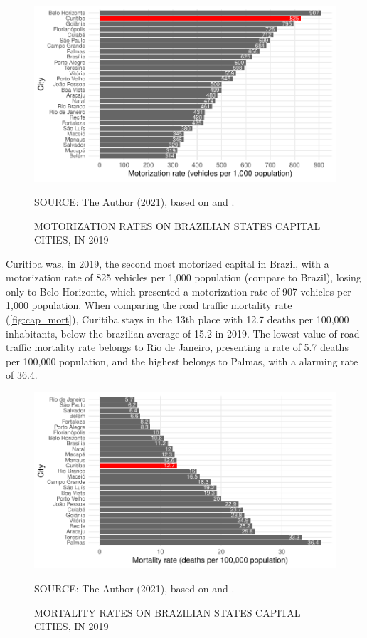 \begin{figure}[!htbp]
    \centering\footnotesize
    \captionsetup{font=footnotesize}
    \caption{MOTORIZATION RATES ON BRAZILIAN STATES CAPITAL CITIES, IN 2019}
    \includegraphics{fig/cap_motor.pdf}
    \label{fig:cap_motor}
    \par SOURCE: The Author (2021), based on \textcite{MinistryofHealth2021} and \textcite{DENATRAN2020}.
\end{figure}   

Curitiba was, in 2019, the second most motorized capital in Brazil, with a motorization rate of 825 vehicles per 1,000 population (compare to Brazil), losing only to Belo Horizonte, which presented a motorization rate of 907 vehicles per 1,000 population. When comparing the road traffic mortality rate (\autoref{fig:cap_mort}), Curitiba stays in the 13th place with 12.7 deaths per 100,000 inhabitants, below the brazilian average of 15.2 in 2019. The lowest value of road traffic mortality rate belongs to Rio de Janeiro, presenting a rate of 5.7 deaths per 100,000 population, and the highest belongs to Palmas, with a alarming rate of 36.4. 

\begin{figure}[!htbp]
    \centering\footnotesize
    \captionsetup{font=footnotesize}
    \caption{MORTALITY RATES ON BRAZILIAN STATES CAPITAL CITIES, IN 2019}
    \includegraphics{fig/cap_mort.pdf}
    \label{fig:cap_mort}
    \par SOURCE: The Author (2021), based on \textcite{MinistryofHealth2020} and \textcite{MinistryofHealth2021}.
\end{figure}  

